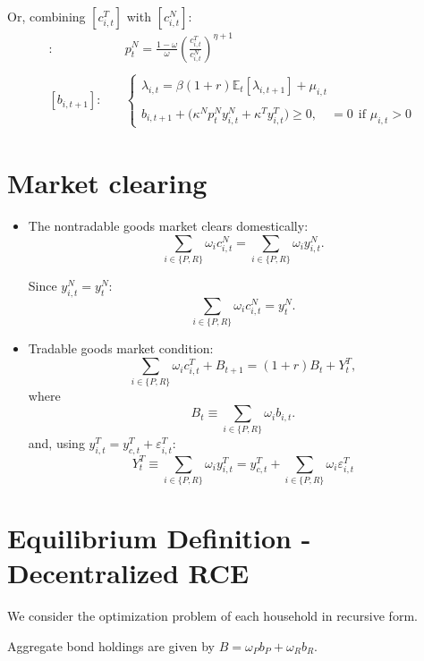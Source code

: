 \documentclass[11pt]{article}
\begin{document}
Or, combining  $[c_{i,t}^T]$ with  $[c_{i,t}^N]$:
\begin{align*}
    [c_{i,t}^T,c_{i,t}^N]: \quad &  p_t^N
=
\frac{1-\omega}{\omega}
\left(
\frac{c_{i,t}^{T}}
{c_{i,t}^{N}}
\right)^{\eta+1}
\\  \\  
[b_{i,t+1}]: \quad & \left\{\begin{array}{lcc}
\lambda_{i,t}=\beta(1+r)\mathbb{E}_t\left[
\lambda_{i,t+1}\right]+\mu_{i,t} \\  \\ 
b_{i,t+1} + \Big(\kappa^N p_t^N y_{i,t}^{N} +\kappa^T y_{i,t}^{T}\Big)\geq 0, \quad =0 \ \ \text{if $\mu_{i,t}>0$}  
\end{array}\right.
\end{align*}

 

 

\section{Market clearing}

\begin{itemize}
    \item The nontradable goods market clears domestically:
\[
\sum_{i\in\{P,R\}}
\omega_i c_{i,t}^{N}
=
\sum_{i\in\{P,R\}}
\omega_i y_{i,t}^{N}.
\]

Since $y_{i,t}^{N}=y_t^N$:
\[
\sum_{i\in\{P,R\}}
\omega_i c_{i,t}^{N}
=
y_t^N.
\]

\item Tradable goods market condition:
\[
\sum_{i\in\{P,R\}}
\omega_i c_{i,t}^{T}
+
B_{t+1}
=
(1+r)B_t
+
Y_t^T,
\]
where 
\[
B_t \equiv \sum_{i\in\{P,R\}}\omega_i b_{i,t}.
\]
and, using $y_{i,t}^{T}=y_{c,t}^{T}+\varepsilon_{i,t}^{T}$:
\[
Y_t^T
\equiv 
\sum_{i\in\{P,R\}}
\omega_i y_{i,t}^{T} = y_{c,t}^{T}
+
\sum_{i\in\{P,R\}}
\omega_i\varepsilon_{i,t}^{T}
\]


\end{itemize}



\section{Equilibrium Definition - Decentralized RCE}


We consider the optimization problem of each household in recursive form. 

Aggregate bond holdings are given by $B=\omega_P b_P+\omega_R b_R$.
\end{document}
